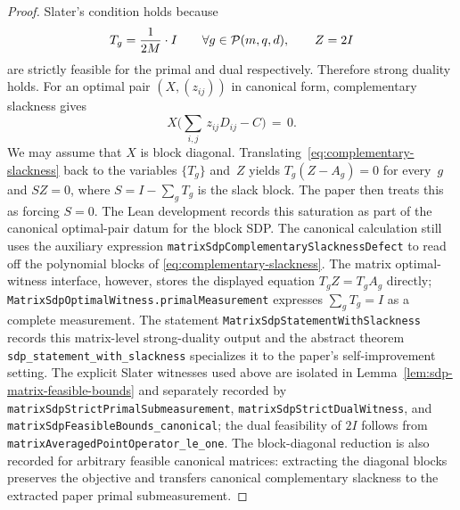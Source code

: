 \begin{proof}
  Slater's condition holds because
  \[
    T_g = \frac{1}{2M}\cdot I \qquad\forall g\in\mathcal{P}(m,q,d),
    \qquad
    Z = 2I
  \]
  are strictly feasible for the primal and dual respectively. Therefore strong duality holds. For an optimal pair $(X,(z_{ij}))$ in canonical form, complementary slackness gives
  \begin{equation}\label{eq:complementary-slackness}
    X\Big( \sum_{i,j} \,z_{ij} D_{ij} - C \Big) \,=\, 0.
  \end{equation}
  We may assume that $X$ is block diagonal.
  Translating~\eqref{eq:complementary-slackness} back to the variables
  $\{T_g\}$ and~$Z$ yields $T_g(Z-A_g)=0$ for every~$g$ and \(S Z=0\), where
  \(S=I-\sum_gT_g\) is the slack block.
  The paper then treats this as forcing \(S=0\).  The Lean development records
  this saturation as part of the canonical optimal-pair datum for the block
  SDP.  The canonical calculation still uses the auxiliary expression
  \texttt{matrixSdpComplementarySlacknessDefect} to read off the polynomial
  blocks of \eqref{eq:complementary-slackness}.  The matrix optimal-witness
  interface, however, stores the displayed equation \(T_gZ=T_gA_g\) directly;
  \texttt{MatrixSdpOptimalWitness.primalMeasurement} expresses
  \(\sum_g T_g=I\) as a complete measurement.  The statement
  \texttt{MatrixSdpStatementWithSlackness} records this matrix-level
  strong-duality output and the abstract theorem
  \texttt{sdp\_statement\_with\_slackness} specializes it to the paper's
  self-improvement setting.  The explicit Slater witnesses used above are
  isolated in Lemma~\ref{lem:sdp-matrix-feasible-bounds} and separately recorded
  by \texttt{matrixSdpStrictPrimalSubmeasurement},
  \texttt{matrixSdpStrictDualWitness}, and
  \texttt{matrixSdpFeasibleBounds\_canonical}; the dual feasibility of \(2I\)
  follows from \texttt{matrixAveragedPointOperator\_le\_one}.
  The block-diagonal reduction is also recorded for arbitrary feasible
  canonical matrices: extracting the diagonal blocks preserves the objective
  and transfers canonical complementary slackness to the extracted paper primal
  submeasurement.
\end{proof}

